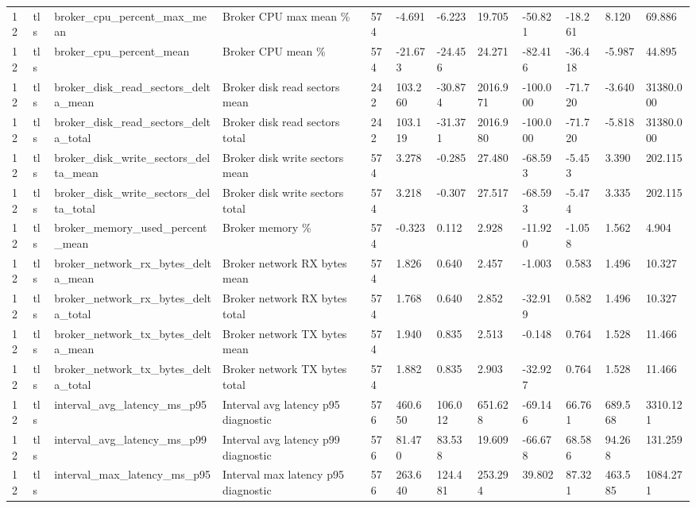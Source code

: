 \begin{longtable}{llllllllllll}
12 & tls & broker\_cpu\_percent\_max\_mean & Broker CPU max mean \% & 574 & -4.691 & -6.223 & 19.705 & -50.821 & -18.261 & 8.120 & 69.886 \\
12 & tls & broker\_cpu\_percent\_mean & Broker CPU mean \% & 574 & -21.673 & -24.456 & 24.271 & -82.416 & -36.418 & -5.987 & 44.895 \\
12 & tls & broker\_disk\_read\_sectors\_delta\_mean & Broker disk read sectors mean & 242 & 103.260 & -30.874 & 2016.971 & -100.000 & -71.720 & -3.640 & 31380.000 \\
12 & tls & broker\_disk\_read\_sectors\_delta\_total & Broker disk read sectors total & 242 & 103.119 & -31.371 & 2016.980 & -100.000 & -71.720 & -5.818 & 31380.000 \\
12 & tls & broker\_disk\_write\_sectors\_delta\_mean & Broker disk write sectors mean & 574 & 3.278 & -0.285 & 27.480 & -68.593 & -5.453 & 3.390 & 202.115 \\
12 & tls & broker\_disk\_write\_sectors\_delta\_total & Broker disk write sectors total & 574 & 3.218 & -0.307 & 27.517 & -68.593 & -5.474 & 3.335 & 202.115 \\
12 & tls & broker\_memory\_used\_percent\_mean & Broker memory \% & 574 & -0.323 & 0.112 & 2.928 & -11.920 & -1.058 & 1.562 & 4.904 \\
12 & tls & broker\_network\_rx\_bytes\_delta\_mean & Broker network RX bytes mean & 574 & 1.826 & 0.640 & 2.457 & -1.003 & 0.583 & 1.496 & 10.327 \\
12 & tls & broker\_network\_rx\_bytes\_delta\_total & Broker network RX bytes total & 574 & 1.768 & 0.640 & 2.852 & -32.919 & 0.582 & 1.496 & 10.327 \\
12 & tls & broker\_network\_tx\_bytes\_delta\_mean & Broker network TX bytes mean & 574 & 1.940 & 0.835 & 2.513 & -0.148 & 0.764 & 1.528 & 11.466 \\
12 & tls & broker\_network\_tx\_bytes\_delta\_total & Broker network TX bytes total & 574 & 1.882 & 0.835 & 2.903 & -32.927 & 0.764 & 1.528 & 11.466 \\
12 & tls & interval\_avg\_latency\_ms\_p95 & Interval avg latency p95 diagnostic & 576 & 460.650 & 106.012 & 651.628 & -69.146 & 66.761 & 689.568 & 3310.121 \\
12 & tls & interval\_avg\_latency\_ms\_p99 & Interval avg latency p99 diagnostic & 576 & 81.470 & 83.538 & 19.609 & -66.678 & 68.586 & 94.268 & 131.259 \\
12 & tls & interval\_max\_latency\_ms\_p95 & Interval max latency p95 diagnostic & 576 & 263.640 & 124.481 & 253.294 & 39.802 & 87.321 & 463.585 & 1084.271 \\

\end{longtable}

